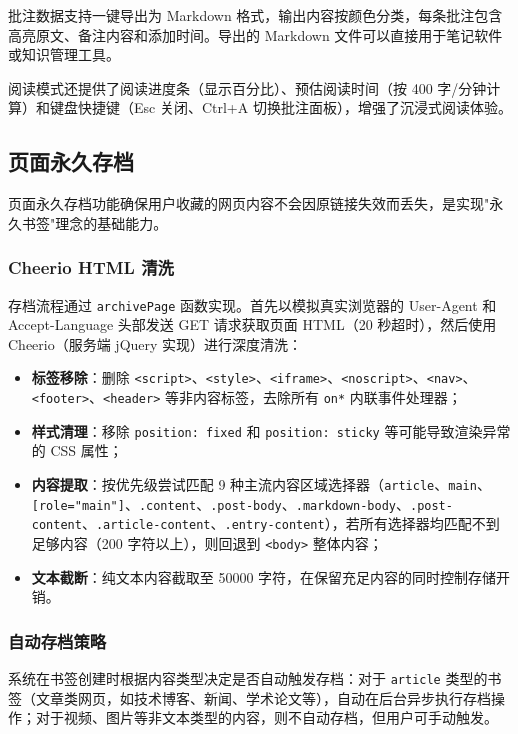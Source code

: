 \documentclass[12pt,a4paper]{ctexart}
\begin{document}
批注数据支持一键导出为 Markdown 格式，输出内容按颜色分类，每条批注包含高亮原文、备注内容和添加时间。导出的 Markdown 文件可以直接用于笔记软件或知识管理工具。

阅读模式还提供了阅读进度条（显示百分比）、预估阅读时间（按 400 字/分钟计算）和键盘快捷键（Esc 关闭、Ctrl+A 切换批注面板），增强了沉浸式阅读体验。

\subsection{页面永久存档}

页面永久存档功能确保用户收藏的网页内容不会因原链接失效而丢失，是实现"永久书签"理念的基础能力。

\subsubsection{Cheerio HTML 清洗}

存档流程通过 \texttt{archivePage} 函数实现。首先以模拟真实浏览器的 User-Agent 和 Accept-Language 头部发送 GET 请求获取页面 HTML（20 秒超时），然后使用 Cheerio（服务端 jQuery 实现）进行深度清洗：

\begin{itemize}
  \item \textbf{标签移除}：删除 \texttt{<script>}、\texttt{<style>}、\texttt{<iframe>}、\texttt{<noscript>}、\texttt{<nav>}、\texttt{<footer>}、\texttt{<header>} 等非内容标签，去除所有 \texttt{on*} 内联事件处理器；
  \item \textbf{样式清理}：移除 \texttt{position: fixed} 和 \texttt{position: sticky} 等可能导致渲染异常的 CSS 属性；
  \item \textbf{内容提取}：按优先级尝试匹配 9 种主流内容区域选择器（\texttt{article}、\texttt{main}、\texttt{[role="main"]}、\texttt{.content}、\texttt{.post-body}、\texttt{.markdown-body}、\texttt{.post-content}、\texttt{.article-content}、\texttt{.entry-content}），若所有选择器均匹配不到足够内容（200 字符以上），则回退到 \texttt{<body>} 整体内容；
  \item \textbf{文本截断}：纯文本内容截取至 50000 字符，在保留充足内容的同时控制存储开销。
\end{itemize}

\subsubsection{自动存档策略}

系统在书签创建时根据内容类型决定是否自动触发存档：对于 \texttt{article} 类型的书签（文章类网页，如技术博客、新闻、学术论文等），自动在后台异步执行存档操作；对于视频、图片等非文本类型的内容，则不自动存档，但用户可手动触发。
\end{document}
